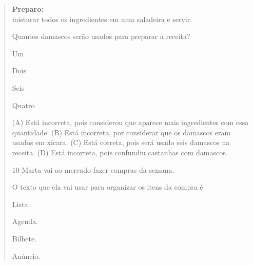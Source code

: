 \begin{verse}
\textbf{Preparo:}\\
misturar todos os ingredientes em uma saladeira e servir.


Quantos damascos serão usados para preparar a receita?

\begin{minipage}{.5\textwidth}
\begin{escolha}
\item Um

\item Dois

\item Seis

\item Quatro
\end{escolha}
\end{minipage}

(A) Está incorreta, pois considerou que aparece mais ingredientes com essa quantidade.
(B) Está incorreta, por considerar que os damascos eram usados em xícara.
(C) Está correta, pois será usado seis damascos na receita.
(D) Está incorreta, pois confundiu castanhas com damascos.

\num{10} Marta vai ao mercado fazer compras da semana.

O texto que ela vai usar para organizar os itens da compra é

\begin{minipage}{.5\textwidth}
\begin{escolha}
\item Lista.

\item Agenda.

\item Bilhete.

\item Anúncio.
\end{escolha}
\end{minipage}
\end{verse}
